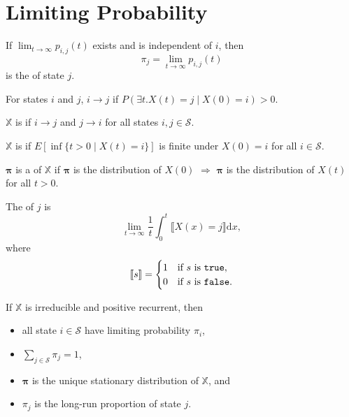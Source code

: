 \section{Limiting Probability}

\begin{definition}
If $ \lim_{t \to \infty} p_{i, j}(t) $ exists and is independent of $ i $, then
\[ \pi_{j} = \lim_{t \to \infty} p_{i, j}(t) \]
is the  of state $ j $.
\end{definition}

\begin{definition}
For states $ i $ and $ j $, $ i \to j $ if $ P(\exists t. X(t) = j \mid X(0) = i) > 0 $.
\end{definition}

\begin{definition}
$ \mathbb{X} $ is  if $ i \to j $ and $ j \to i $ for all states $ i, j \in \mathcal{S} $.
\end{definition}

\begin{definition}
$ \mathbb{X} $ is  if $ E[\inf \{ t > 0 \mid X(t) = i \}] $ is finite under $ X(0) = i $ for all $ i \in \mathcal{S} $.
\end{definition}

\begin{definition}
$ \boldsymbol\pi $ is a  of $ \mathbb{X} $ if $ \boldsymbol\pi $ is the distribution of $ X(0) $ $ \Rightarrow $ $ \boldsymbol\pi $ is the distribution of $ X(t) $ for all $ t > 0 $.
\end{definition}

\begin{definition}
The  of $ j $ is
\[ \lim_{t \to \infty} \frac{1}{t} \int_{0}^{t} \llbracket X(x) = j \rrbracket \mathrm{d}x, \]
where
\[ \llbracket s \rrbracket = \begin{cases}
1 & \text{if $ s $ is \texttt{true}}, \\
0 & \text{if $ s $ is \texttt{false}}.
\end{cases} \]
\end{definition}

\begin{theorem}
If $ \mathbb{X} $ is irreducible and positive recurrent, then
\begin{itemize}
  \item all state $ i \in \mathcal{S} $ have limiting probability $ \pi_{i} $,
  \item $ \sum_{j \in \mathcal{S}} \pi_{j} = 1 $,
  \item $ \boldsymbol\pi $ is the unique stationary distribution of $ \mathbb{X} $, and
  \item $ \pi_{j} $ is the long-run proportion of state $ j $.
\end{itemize}
\end{theorem}

